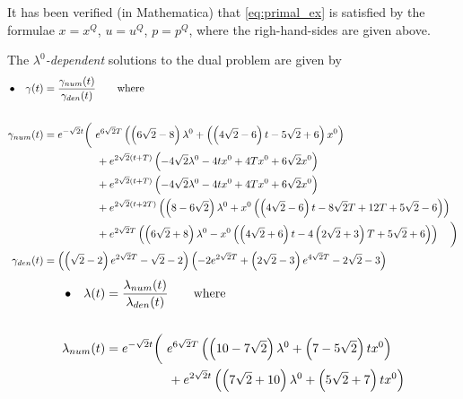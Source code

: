 \documentclass[11pt]{article}
\begin{document}
\begin{appendix}
It has been verified (in {\sf Mathematica}) that \eqref{eq:primal_ex} is satisfied by the formulae $x = x^Q$,  $u = u^Q$, $p = p^Q$, where the righ-hand-sides are given above. 

The \emph{$\lambda^0$-dependent} solutions to the dual problem are given by 
\begin{subequations}
\allowdisplaybreaks
    \begin{align}
    \bullet \quad \gamma(t) & = \frac{\gamma_{num}(t)}{\gamma_{den}(t)} \qquad \mbox{where} \notag\\
    \notag\\
    \gamma_{num}(t) & = e^{-\sqrt{2} t} \bigg( \ e^{6 \sqrt{2} T} \left(\left(6 \sqrt{2}-8\right) \lambda^0+\left(\left(4 \sqrt{2}-6\right) t-5 \sqrt{2}+6\right) x^0\right) \notag\\
    & \qquad \qquad \quad +e^{2 \sqrt{2} (t+T)} \left(-4 \sqrt{2} \lambda^0-4 t x^0+4 T x^0+6 \sqrt{2} x^0\right) \notag\\
    & \qquad \qquad \quad   + e^{2 \sqrt{2} (t+T)} \left(-4 \sqrt{2} \lambda^0-4 t x^0+4 T x^0+6 \sqrt{2} x^0\right) \notag\\
    & \qquad \qquad \quad +e^{2 \sqrt{2} (t+2 T)} \left(\left(8-6 \sqrt{2}\right) \lambda^0+x^0 \left(\left(4 \sqrt{2}-6\right) t-8 \sqrt{2} T+12 T+5 \sqrt{2}-6\right)\right) \notag\\
    & \qquad \qquad \quad  +e^{2 \sqrt{2} T} \left(\left(6 \sqrt{2}+8\right) \lambda^0-x^0 \left(\left(4 \sqrt{2}+6\right) t-4 \left(2 \sqrt{2}+3\right) T+5 \sqrt{2}+6\right)\right) \quad \bigg) \notag\\
    \gamma_{den}(t) & = \left(\left(\sqrt{2}-2\right) e^{2 \sqrt{2} T}-\sqrt{2}-2\right) \left(-2 e^{2 \sqrt{2} T}+\left(2 \sqrt{2}-3\right) e^{4 \sqrt{2} T}-2 \sqrt{2}-3\right) \notag
    \end{align}
\end{subequations}
\begin{subequations}
\allowdisplaybreaks
    \begin{align}
     \bullet \quad \lambda(t) & = \frac{\lambda_{num}(t)}{\lambda_{den}(t)} \qquad \mbox{where} \notag\\
    \notag\\
      \lambda_{num} (t) & =  e^{-\sqrt{2} t}\bigg( \ e^{6 \sqrt{2} T} \left(\left(10-7 \sqrt{2}\right) \lambda^0+\left(7-5 \sqrt{2}\right) t x^0\right) \notag\\
           & \qquad \qquad \quad +e^{2 \sqrt{2} t} \left(\left(7 \sqrt{2}+10\right) \lambda^0+\left(5 \sqrt{2}+7\right) t x^0\right) \notag\\

\end{align}
\end{subequations}
\end{appendix}
\end{document}
